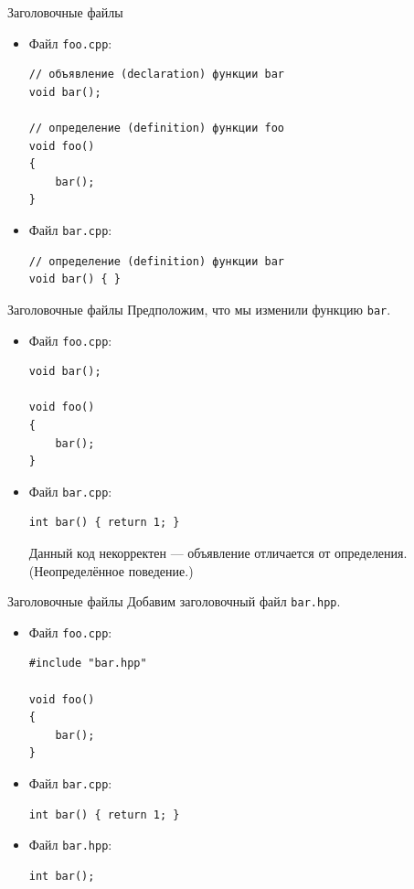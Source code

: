 \documentclass[aspectration=1610,t]{beamer}
\begin{document}
\begin{frame}[fragile]{Заголовочные файлы}
\begin{itemize}
    \item Файл {\tt foo.cpp}:
{\small \begin{lstlisting}
// объявление (declaration) функции bar
void bar();

// определение (definition) функции foo
void foo()
{
    bar();
}
\end{lstlisting}}

\item Файл {\tt bar.cpp}:
\begin{lstlisting}
// определение (definition) функции bar
void bar() { }
\end{lstlisting}
\end{itemize}
\end{frame}

\begin{frame}[fragile]{Заголовочные файлы}
    Предположим, что мы изменили функцию {\tt bar}.
\begin{itemize}
    \item Файл {\tt foo.cpp}:
{\small \begin{lstlisting}
void bar();

void foo()
{
    bar();
}
\end{lstlisting}}

\item Файл {\tt bar.cpp}:
\begin{lstlisting}
int bar() { return 1; }
\end{lstlisting}

Данный код некорректен — объявление отличается от определения.
(Неопределённое поведение.)
\end{itemize}
\end{frame}

\begin{frame}[fragile]{Заголовочные файлы}
    Добавим заголовочный файл {\tt bar.hpp}.
\begin{itemize}

    \item Файл {\tt foo.cpp}:
\begin{lstlisting}
#include "bar.hpp"

void foo()
{
    bar();
}
\end{lstlisting}

\item Файл {\tt bar.cpp}:
\begin{lstlisting}
int bar() { return 1; }
\end{lstlisting}

    \item Файл {\tt bar.hpp}:
\begin{lstlisting}
int bar();
\end{lstlisting}
\end{itemize}
\end{frame}
\end{document}
